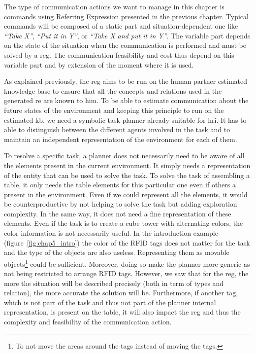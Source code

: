 The type of communication actions we want to manage in this chapter is commands using Referring Expression presented in the previous chapter. Typical commands will be composed of a static part and situation-dependent one like \textit{``Take X''}, \textit{``Put it in Y''}, or \textit{``Take X and put it in Y''}. The variable part depends on the state of the situation when the communication is performed and must be solved by a \acrshort{reg}. The communication feasibility and cost thus depend on this variable part and by extension of the moment where it is used.

As explained previously, the \acrshort{reg} aims to be run on the human partner estimated knowledge base to ensure that all the concepts and relations used in the generated \acrshort{re} are known to him. To be able to estimate communication about the future states of the environment and keeping this principle to run on the estimated \acrshort{kb}, we need a symbolic task planner already suitable for \acrshort{hri}. It has to able to distinguish between the different agents involved in the task and to maintain an independent representation of the environment for each of them.

To resolve a specific task, a planner does not necessarily need to be aware of all the elements present in the current environment. It simply needs a representation of the entity that can be used to solve the task. To solve the task of assembling a table, it only needs the table elements for this particular one even if others a present in the environment. Even if we could represent all the elements, it would be counterproductive by not helping to solve the task but adding exploration complexity.
In the same way, it does not need a fine representation of these elements. Even if the task is to create a cube tower with alternating colors, the color information is not necessarily useful. In the introduction example (figure~\ref{fig:chap5_intro}) the color of the RFID tags does not matter for the task and the type of the objects are also useless. Representing them as movable objects\footnote{To not move the areas around the tags instead of moving the tags.} could be sufficient. Moreover, doing so make the planner more generic as not being restricted to arrange RFID tags. However, we saw that for the \acrshort{reg}, the more the situation will be described precisely (both in term of types and relation), the more accurate the solution will be. Furthermore, if another tag, which is not part of the task and thus not part of the planner internal representation, is present on the table, it will also impact the \acrshort{reg} and thus the complexity and feasibility of the communication action. 

